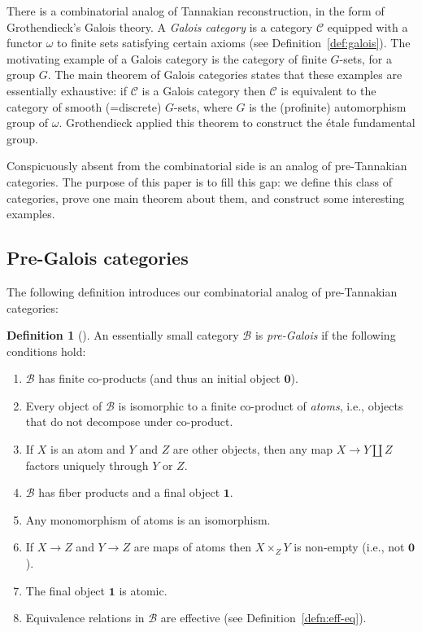 \documentclass[12pt]{amsart}
\numberwithin{equation}{section}
\theoremstyle{definition}
\newtheorem{defnaux}[equation]{Definition}
\newenvironment{definition}[1][]{\begin{defnaux}[#1]\pushQED{\qed}}{\popQED \end{defnaux}}
\newcommand{\cB}{\mathcal{B}}
\newcommand{\cC}{\mathcal{C}}
\newcommand{\defn}[1]{\emph{#1}}
\newcommand{\bzero}{\mathbf{0}}
\newcommand{\bone}{\mathbf{1}}
\begin{document}
There is a combinatorial analog of Tannakian reconstruction, in the form of Grothendieck's Galois theory. A \defn{Galois category} is a category $\cC$ equipped with a functor $\omega$ to finite sets satisfying certain axioms (see Definition~\ref{def:galois}). The motivating example of a Galois category is the category of finite $G$-sets, for a group $G$. The main theorem of Galois categories states that these examples are essentially exhaustive: if $\cC$ is a Galois category then $\cC$ is equivalent to the category of smooth (=discrete) $G$-sets, where $G$ is the (profinite) automorphism group of $\omega$. Grothendieck applied this theorem to construct the \'etale fundamental group.

Conspicuously absent from the combinatorial side is an analog of pre-Tannakian categories. The purpose of this paper is to fill this gap: we define this class of categories, prove one main theorem about them, and construct some interesting examples.

\subsection{Pre-Galois categories}

The following definition introduces our combinatorial analog of pre-Tannakian categories:

\begin{definition} \label{defn:galois-intro}
An essentially small category $\cB$ is \defn{pre-Galois} if the following conditions hold:
\begin{enumerate}
\item $\cB$ has finite co-products (and thus an initial object $\bzero$).
\item Every object of $\cB$ is isomorphic to a finite co-product of \defn{atoms}, i.e., objects that do not decompose under co-product.
\item If $X$ is an atom and $Y$ and $Z$ are other objects, then any map $X \to Y \amalg Z$ factors uniquely through $Y$ or $Z$.
\item $\cB$ has fiber products and a final object $\bone$.
\item Any monomorphism of atoms is an isomorphism.
\item If $X \to Z$ and $Y \to Z$ are maps of atoms then $X \times_Z Y$ is non-empty (i.e., not $\bzero$).
\item The final object $\bone$ is atomic.
\item Equivalence relations in $\cB$ are effective (see Definition~\ref{defn:eff-eq}). \qedhere
\end{enumerate}
\end{definition}
\end{document}
